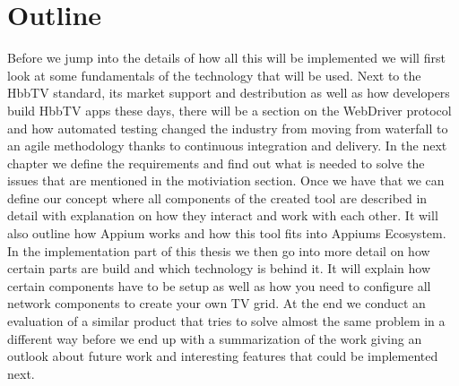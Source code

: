 \section{Outline\label{sec:outline}}

Before we jump into the details of how all this will be implemented we will first look at some fundamentals
of the technology that will be used. Next to the HbbTV standard, its market support and destribution as well
as how developers build HbbTV apps these days, there will be a section on the WebDriver protocol and how
automated testing changed the industry from moving from waterfall to an agile methodology thanks to
continuous integration and delivery. In the next chapter we define the requirements and find out what is
needed to solve the issues that are mentioned in the motiviation section. Once we have that we can define
our concept where all components of the created tool are described in detail with explanation on how they
interact and work with each other. It will also outline how Appium works and how this tool fits into
Appiums Ecosystem. In the implementation part of this thesis we then go into more detail on how certain
parts are build and which technology is behind it. It will explain how certain components have to be
setup as well as how you need to configure all network components to create your own TV grid. At the
end we conduct an evaluation of a similar product that tries to solve almost the same problem in a
different way before we end up with a summarization of the work giving an outlook about future work and
interesting features that could be implemented next.
